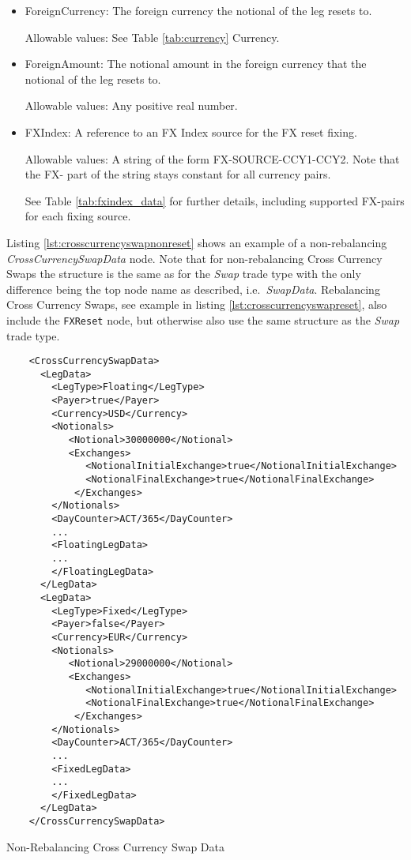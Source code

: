 \begin{itemize}

\item ForeignCurrency: The foreign currency the notional of the leg resets to.  

Allowable values:  See Table \ref{tab:currency} Currency.

\item ForeignAmount: The notional amount in the foreign currency that the notional of the leg resets to.  

Allowable values:  Any positive real number.

\item FXIndex: A reference to an FX Index source for the FX reset fixing. 

Allowable values:  A string of the form FX-SOURCE-CCY1-CCY2. Note that the FX- part of the string stays constant for all currency pairs.

See Table \ref{tab:fxindex_data} for further details, including supported FX-pairs for each fixing source.

\end{itemize}

Listing \ref{lst:crosscurrencyswapnonreset} shows an example of a non-rebalancing \emph{CrossCurrencySwapData} node. Note that for non-rebalancing Cross Currency Swaps the structure is the same as for the \emph{Swap} trade type with the only difference being the top node name as described, i.e.\ \emph{SwapData}. Rebalancing Cross Currency Swaps, see example in listing \ref{lst:crosscurrencyswapreset}, also include the \lstinline!FXReset! node, but otherwise also use the same structure as the \emph{Swap} trade type.

\begin{listing}[H]
\begin{verbatim}
    <CrossCurrencySwapData>
      <LegData>
        <LegType>Floating</LegType>
        <Payer>true</Payer>
        <Currency>USD</Currency>
        <Notionals>
           <Notional>30000000</Notional>
           <Exchanges>
              <NotionalInitialExchange>true</NotionalInitialExchange>
              <NotionalFinalExchange>true</NotionalFinalExchange>
            </Exchanges>
        </Notionals>
        <DayCounter>ACT/365</DayCounter>
        ...
        <FloatingLegData>
        ...
        </FloatingLegData>
      </LegData>
      <LegData>
        <LegType>Fixed</LegType>
        <Payer>false</Payer>
        <Currency>EUR</Currency>
        <Notionals>
           <Notional>29000000</Notional>
           <Exchanges>
              <NotionalInitialExchange>true</NotionalInitialExchange>
              <NotionalFinalExchange>true</NotionalFinalExchange>
            </Exchanges>
        </Notionals>        
        <DayCounter>ACT/365</DayCounter>
        ...
        <FixedLegData>
        ...
        </FixedLegData>
      </LegData>
    </CrossCurrencySwapData>
\end{verbatim}
\caption{Non-Rebalancing Cross Currency Swap Data}
\label{lst:crosscurrencyswapnonreset}
\end{listing}

